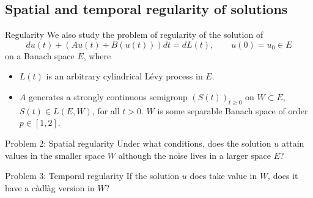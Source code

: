 \documentclass[xcolor=dvipsnames,leqno]{beamer}
\begin{document}
\subsection{Spatial and temporal regularity of solutions}

\begin{frame}{Regularity}
We also study the problem of regularity of the solution of 
		$$%
			        du(t)+(Au(t)+B(u(t)))dt=dL(t), \qquad u(0)=u_0\in E%
		$$
on a Banach space $E$,
where
\begin{itemize}
	\item $L(t)$ is an arbitrary cylindrical L\'evy process in $E$. %
	\item $A$ generates a strongly continuous semigroup $(S(t))_{t\geq 0}$ on $W\subset E$, $S(t)\in L(E, W)$, for all $t>0$. $W$ is some separable Banach space of order $p\in [1,2]$.
\end{itemize}
\begin{block}{Problem 2: Spatial regularity}
Under what conditions, does the solution $u$ attain values in the smaller space $W$ although the noise lives in a larger space $E$? 
\end{block}
\begin{block}{Problem 3: Temporal regularity}
If the solution $u$ does take value in $W$, does it have a c\`adl\`ag version in $W$?	
\end{block}
\end{frame}
\end{document}
